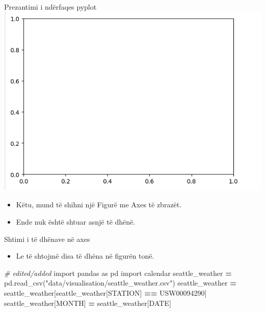 \documentclass[
  ignorenonframetext,
]{beamer}
\newenvironment{Shaded}{\begin{snugshade}}{\end{snugshade}}
\newcommand{\CommentTok}[1]{\textcolor[rgb]{0.56,0.35,0.01}{\textit{#1}}}
\newcommand{\ImportTok}[1]{#1}
\newcommand{\NormalTok}[1]{#1}
\newcommand{\OperatorTok}[1]{\textcolor[rgb]{0.81,0.36,0.00}{\textbf{#1}}}
\newcommand{\StringTok}[1]{\textcolor[rgb]{0.31,0.60,0.02}{#1}}
\providecommand{\tightlist}{%
  \setlength{\itemsep}{0pt}\setlength{\parskip}{0pt}}
\begin{document}
\begin{frame}{Prezantimi i ndërfaqes pyplot}
\protect\hypertarget{prezantimi-i-nduxebrfaqes-pyplot-5}{}
\includegraphics{./Figs/matplot2.png}

\begin{itemize}
\item
  Këtu, mund të shihni një Figurë me Axes të zbrazët.
\item
  Ende nuk është shtuar asnjë të dhënë.
\end{itemize}
\end{frame}

\begin{frame}[fragile]{Shtimi i të dhënave në axes}
\protect\hypertarget{shtimi-i-tuxeb-dhuxebnave-nuxeb-axes}{}
\begin{itemize}
\tightlist
\item
  Le të shtojmë disa të dhëna në figurën tonë.
\end{itemize}


\begin{Shaded}
\begin{Highlighting}[]
\CommentTok{\# edited/added}
\ImportTok{import}\NormalTok{ pandas }\ImportTok{as}\NormalTok{ pd}
\ImportTok{import}\NormalTok{ calendar}
\NormalTok{seattle\_weather }\OperatorTok{=}\NormalTok{ pd.read\_csv(}\StringTok{"data/visualisation/seattle\_weather.csv"}\NormalTok{)}
\NormalTok{seattle\_weather }\OperatorTok{=}\NormalTok{ seattle\_weather[seattle\_weather[}\StringTok{\textquotesingle{}STATION\textquotesingle{}}\NormalTok{] }\OperatorTok{==} \StringTok{\textquotesingle{}USW00094290\textquotesingle{}}\NormalTok{]}
\NormalTok{seattle\_weather[}\StringTok{\textquotesingle{}MONTH\textquotesingle{}}\NormalTok{] }\OperatorTok{=}\NormalTok{ seattle\_weather[}\StringTok{\textquotesingle{}DATE\textquotesingle{}}\NormalTok{]}
\end{Highlighting}
\end{Shaded}
\end{frame}
\end{document}
